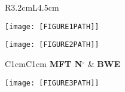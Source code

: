\documentclass{article}
\begin{document}
\begin{figure}
    \begin{minipage}[c]{.35\linewidth}
      \centering
        \begin{tabular}{R{3.2cm}L{4.5cm}}
          \bottomrule
        \end{tabular}
           
    \end{minipage}\hfill
    \begin{minipage}[c]{.55\linewidth}
        \centering
        \texttt{[image: [FIGURE1PATH]]}  

    \end{minipage}
\end{figure}



\begin{figure}[H]
\centering
\begin{minipage}{.8\linewidth}
    \centering
    \texttt{[image: [FIGURE2PATH]]} %
\end{minipage}
\begin{minipage}{.15\linewidth}  %
    \centering
    \begin{tabular}{C{1cm}C{1cm}}
    \hline
    \textbf{MFT N$^\circ$} & \textbf{BWE} \\ \hline
    \hline
    \end{tabular}
\end{minipage}
\end{figure}








\begin{figure}[!h]
    \centering 
    \texttt{[image: [FIGURE3PATH]]}
\end{figure}
\end{document}
